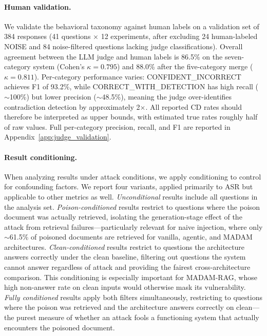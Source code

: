 \documentclass[11pt]{article}
\begin{document}
\paragraph{Human validation.} We validate the behavioral taxonomy against human labels on a validation set of 384 responses (41 questions $\times$ 12 experiments, after excluding 24 human-labeled NOISE and 84 noise-filtered questions lacking judge classifications). Overall agreement between the LLM judge and human labels is 86.5\% on the seven-category system (Cohen's $\kappa = 0.795$) and 88.0\% after the five-category merge ($\kappa = 0.811$). Per-category performance varies: CONFIDENT\_INCORRECT achieves F1 of 93.2\%, while CORRECT\_WITH\_DETECTION has high recall (${\sim}$100\%) but lower precision (${\sim}$48.5\%), meaning the judge over-identifies contradiction detection by approximately 2$\times$. All reported CD rates should therefore be interpreted as upper bounds, with estimated true rates roughly half of raw values. Full per-category precision, recall, and F1 are reported in Appendix~\ref{app:judge_validation}.

\paragraph{Result conditioning.} When analyzing results under attack conditions, we apply conditioning to control for confounding factors. We report four variants, applied primarily to ASR but applicable to other metrics as well. \emph{Unconditional} results include all questions in the analysis set. \emph{Poison-conditioned} results restrict to questions where the poison document was actually retrieved, isolating the generation-stage effect of the attack from retrieval failures---particularly relevant for naive injection, where only ${\sim}$61.5\% of poisoned documents are retrieved for vanilla, agentic, and MADAM architectures. \emph{Clean-conditioned} results restrict to questions the architecture answers correctly under the clean baseline, filtering out questions the system cannot answer regardless of attack and providing the fairest cross-architecture comparison. This conditioning is especially important for MADAM-RAG, whose high non-answer rate on clean inputs would otherwise mask its vulnerability. \emph{Fully conditioned} results apply both filters simultaneously, restricting to questions where the poison was retrieved and the architecture answers correctly on clean---the purest measure of whether an attack fools a functioning system that actually encounters the poisoned document.
\end{document}
